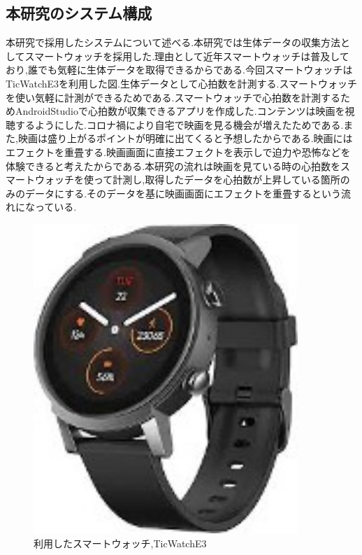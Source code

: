 \subsection{本研究のシステム構成}
本研究で採用したシステムについて述べる.本研究では生体データの収集方法としてスマートウォッチを採用した.理由として近年スマートウォッチは普及しており,誰でも気軽に生体データを取得できるからである.今回スマートウォッチはTicWatchE3を利用した図.生体データとして心拍数を計測する.スマートウォッチを使い気軽に計測ができるためである.スマートウォッチで心拍数を計測するためAndroidStudioで心拍数が収集できるアプリを作成した.コンテンツは映画を視聴するようにした.コロナ禍により自宅で映画を見る機会が増えたためである.また,映画は盛り上がるポイントが明確に出てくると予想したからである.映画にはエフェクトを重畳する.映画画面に直接エフェクトを表示しで迫力や恐怖などを体験できると考えたからである.本研究の流れは映画を見ている時の心拍数をスマートウォッチを使って計測し,取得したデータを心拍数が上昇している箇所のみのデータにする.そのデータを基に映画画面にエフェクトを重畳するという流れになっている.
\begin{figure}[H]
    \centering
    \includegraphics[width=10cm]{images/chapter3/tokei.jpg}
    \caption{利用したスマートウォッチ,TicWatchE3}
\end{figure}

